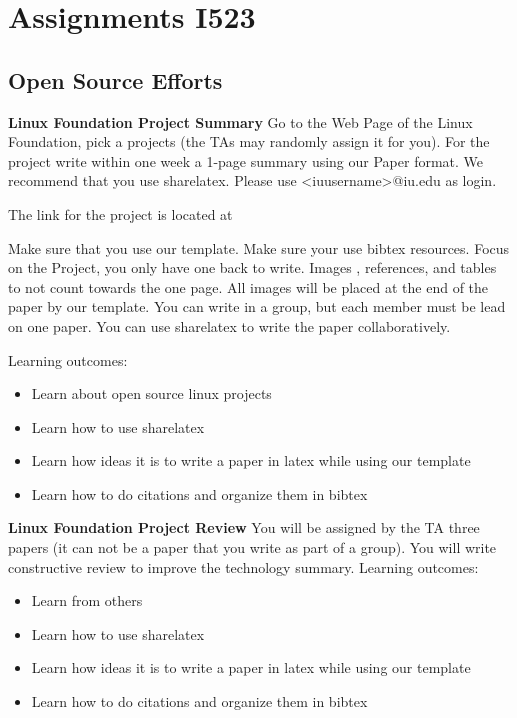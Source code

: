 \section{Assignments I523}
\label{s:i523-assignment}

\subsection{Open Source Efforts}

\begin{exercise} {\bf Linux Foundation Project Summary}
Go to the Web Page of the Linux Foundation, pick a projects (the TAs
may randomly assign it for you). For the project write within
one week a 1-page summary using our Paper format. We recommend that
you use sharelatex. Please use <iuusername>@iu.edu as login. 

The link for the project is located at

Make sure that you use our template. Make sure your use bibtex
resources. Focus on the Project, you only have one back to
write. Images , references, and tables to not count towards the one
page. All images will be placed at the end of the paper by our
template. You can write in a group, but each member must be lead on
one paper. You can use sharelatex to write the paper collaboratively.

Learning outcomes:
\begin{itemize}
\item Learn about open source linux projects
\item Learn how to use sharelatex
\item Learn how ideas it is to write a paper in latex while using our
  template
\item Learn how to do citations and organize them in bibtex
\end{itemize}
\end{exercise} 

\begin{exercise} {\bf Linux Foundation Project Review}
You will be assigned by the TA three papers (it can not be a paper that you
write as part of a group). You will write constructive  review to
improve the technology summary.
Learning outcomes:
\begin{itemize}
\item Learn from others 
\item Learn how to use sharelatex
\item Learn how ideas it is to write a paper in latex while using our
  template
\item Learn how to do citations and organize them in bibtex
\end{itemize}

\end{exercise} 


